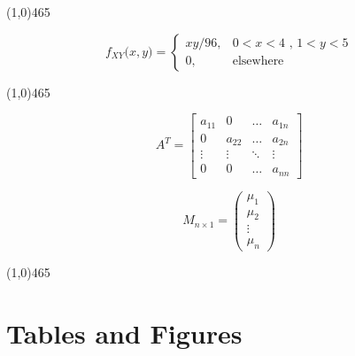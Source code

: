 \documentclass[12pt]{article}
\newenvironment{tightcenter}{%
  \setlength\topsep{0pt}
  \setlength\parskip{0pt}
  \begin{center}
}{%
  \end{center}
}
\begin{document}
\begin{tightcenter}
\line(1,0){465}
\end{tightcenter}

\[
f_{XY}\textbf{(}x,y\textbf{)}=
\begin{cases}
xy/96, &0 < x < 4\text{ , }1<y<5\\
0, &\text{elsewhere}
\end{cases}
\]

\begin{tightcenter}
\line(1,0){465}
\end{tightcenter}

$$
A^{T} = \left[
\begin{matrix}
a_{11} & 0 & \ldots & a_{1n}\\
0 & a_{22} & \ldots & a_{2n}\\
\vdots & \vdots & \ddots & \vdots\\
0 & 0 &\ldots & a_{nn}
\end{matrix}
\right]
$$

$$
M_{n \times 1} = \left(
\begin{matrix}
\mu_{1}\\
\mu_{2}\\
\vdots\\
\mu_{n}
\end{matrix}
\right)
$$

\begin{tightcenter}
\line(1,0){465}
\end{tightcenter}

\newpage


\section*{Tables and Figures}
\end{document}
